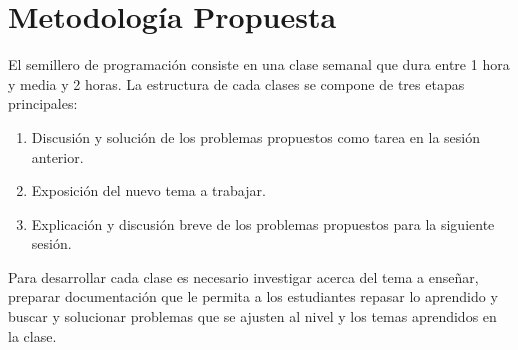\documentclass[11pt, oneside]{article}
\theoremstyle{definition}
\theoremstyle{remark}
\begin{document}
\section{Metodología Propuesta}
El semillero de programación consiste en una clase semanal que dura entre 1 hora y media y 2 horas. La estructura de cada clases se compone de tres etapas principales:
\begin{enumerate}
	\item{Discusión y solución de los problemas propuestos como tarea en la sesión anterior.}
	\item{Exposición del nuevo tema a trabajar.}
	\item{Explicación y discusión breve de los problemas propuestos para la siguiente sesión.}
\end{enumerate}
Para desarrollar cada clase es necesario investigar acerca del tema a enseñar, preparar documentación que le permita a los estudiantes repasar lo aprendido y buscar y solucionar problemas que se ajusten al nivel y los temas aprendidos en la clase.
\end{document}
